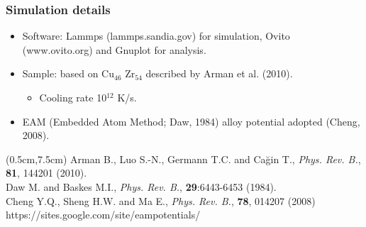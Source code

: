 
\begin{frame}
    \frametitle{Simulation details}
    \vspace{0.2cm}
    \begin{itemize}
        \item Software: Lammps (lammps.sandia.gov) for simulation, Ovito (www.ovito.org) and Gnuplot for analysis.
        \item Sample: based on Cu$_{46}$ Zr$_{54}$ described by Arman et al. (2010).
        \begin{itemize}
            \item Cooling rate 10$^{12}$ K/s.
        \end{itemize}
        \item EAM (Embedded Atom Method; Daw, 1984) alloy potential adopted (Cheng, 2008).
    \end{itemize}
    \begin{textblock*}{12cm}(0.5cm,7.5cm) %
        \scriptsize{Arman B., Luo S.-N., Germann T.C. and Cağin T., \textit{Phys. Rev. B.}, \textbf{81}, 144201 (2010).\\
        Daw M. and Baskes M.I., \textit{Phys. Rev. B.}, \textbf{29}:6443-6453 (1984).\\
        Cheng Y.Q., Sheng H.W. and Ma E., \textit{Phys. Rev. B.}, \textbf{78}, 014207 (2008) https://sites.google.com/site/eampotentials/}
    \end{textblock*}
\end{frame}


